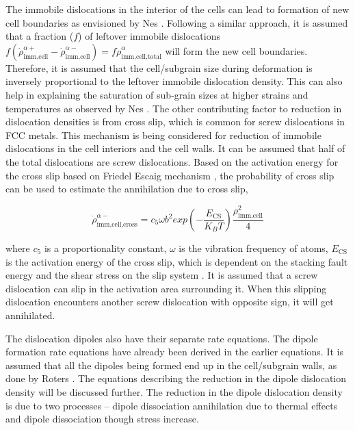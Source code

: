\documentclass[a4paper,11pt]{article}
\begin{document}
The immobile dislocations in the interior of the cells can lead to formation of new cell boundaries as envisioned by Nes \cite{Nes1997}.
Following a similar approach, it is assumed that a fraction (\begin{math} f \end{math}) of leftover immobile dislocations 
\begin{math} f \left(\dot\rho_{\text{imm,cell}}^{\alpha+} - \dot\rho_{\text{imm,cell}}^{\alpha-} \right) = f \dot\rho_{\text{imm,cell,total}}^{\alpha}\end{math} will form the new cell boundaries. 
Therefore, it is assumed that the cell/subgrain size during deformation is inversely proportional to the leftover immobile dislocation density. 
This can also help in explaining the saturation of sub-grain sizes at higher strains and temperatures as observed by Nes \cite{Nes1997}.
%
The other contributing factor to reduction in dislocation densities is from cross slip, which is common for screw dislocations in FCC metals. 
This mechanism is being considered for reduction of immobile dislocations in the cell interiors and the cell walls. 
It can be assumed that half of the total dislocations are screw dislocations. 
Based on the activation energy for the cross slip based on Friedel Escaig mechanism \cite{Puschl2002}, the probability of cross slip can be used to estimate the annihilation due to cross slip,

\begin{equation}
\dot\rho_{\text{imm,cell,cross}}^{\alpha-} = c_5 \omega b^2 exp\left( - \frac{E_{\text{CS}}}{K_B T} \right) \frac{\rho_{\text{imm,cell}}^2}{4} \label{eq:16}
\end{equation}

where \begin{math} c_5 \end{math} is a proportionality constant, \begin{math} \omega \end{math} is the vibration frequency of atoms, \begin{math} E_{\text{CS}} \end{math} is the activation energy of the cross slip, 
which is dependent on the stacking fault energy and the shear stress on the slip system \cite{Puschl2002}. 
It is assumed that a screw dislocation can slip in the activation area surrounding it. 
When this slipping dislocation encounters another screw dislocation with opposite sign, it will get annihilated. 

The dislocation dipoles also have their separate rate equations. 
The dipole formation rate equations have already been derived in the earlier equations. 
It is assumed that all the dipoles being formed end up in the cell/subgrain walls, as done by Roters \cite{Roters2000}. 
The equations describing the reduction in the dipole dislocation density will be discussed further. 
The reduction in the dipole dislocation density is due to two processes – dipole dissociation annihilation due to thermal effects and dipole dissociation though stress increase.
\end{document}
